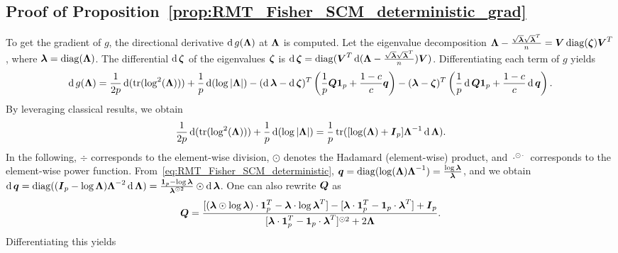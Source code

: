 \subsection{Proof of Proposition~\ref{prop:RMT_Fisher_SCM_deterministic_grad}}

To get the gradient of $g$, the directional derivative $\operatorname{d} g(\boldsymbol{\Lambda})$ at $\boldsymbol{\Lambda}$ is computed.
%
Let the eigenvalue decomposition $\boldsymbol{\Lambda} - \frac{\sqrt{\boldsymbol{\lambda}}\sqrt{\boldsymbol{\lambda}}^T}{n}=\boldsymbol{V}\operatorname{diag}(\boldsymbol{\zeta})\boldsymbol{V}^T$, where $\boldsymbol{\lambda}=\operatorname{diag}(\boldsymbol{\Lambda})$.
The differential $\operatorname{d}\boldsymbol{\zeta}$ of the eigenvalues $\boldsymbol{\zeta}$ is $\operatorname{d}\boldsymbol{\zeta}=\operatorname{diag}(\boldsymbol{V}^T\operatorname{d}(\boldsymbol{\Lambda} - \frac{\sqrt{\boldsymbol{\lambda}}\sqrt{\boldsymbol{\lambda}}^T}{n})\boldsymbol{V})$.
%
Differentiating each term of $g$ yields
\begin{equation*}
    \operatorname{d} g(\boldsymbol{\Lambda}) = \frac{1}{2p} \operatorname{d} (\operatorname{tr}(\log^2(\boldsymbol{\Lambda}))) + \frac{1}{p} \operatorname{d} (\log|\boldsymbol{\Lambda}|) - (\operatorname{d} \boldsymbol{\lambda}-\operatorname{d} \boldsymbol{\zeta})^T\left( \frac{1}{p} \boldsymbol{Q}\boldsymbol{1}_{p} +\frac{1-c}{c} \boldsymbol{q} \right) - (\boldsymbol{\lambda}-\boldsymbol{\zeta})^T\left( \frac{1}{p} \operatorname{d}\boldsymbol{Q}\boldsymbol{1}_{p}
    +\frac{1-c}{c} \operatorname{d}\boldsymbol{q} \right).
\end{equation*}
%
By leveraging classical results, we obtain
\begin{equation*}
    \frac{1}{2p} \operatorname{d} (\operatorname{tr}(\log^2(\boldsymbol{\Lambda}))) + \frac{1}{p} \operatorname{d} (\log|\boldsymbol{\Lambda}|)
    =
    \frac1p\operatorname{tr}([\log(\boldsymbol{\Lambda})+\boldsymbol{I}_{p}]\boldsymbol{\Lambda}^{-1}\operatorname{d}\boldsymbol{\Lambda}).
\end{equation*}
%
In the following, $\div$ corresponds to the element-wise division, $\odot$ denotes the Hadamard (element-wise) product, and $\cdot^{\odot\cdot}$ corresponds to the element-wise power function.
%
From~\eqref{eq:RMT_Fisher_SCM_deterministic}, $\boldsymbol{q}=\operatorname{diag}(\log(\boldsymbol{\Lambda})\boldsymbol{\Lambda}^{-1})=\frac{\log\boldsymbol{\lambda}}{\boldsymbol{\lambda}}$, and we obtain $\operatorname{d}\boldsymbol{q}=\operatorname{diag}((\boldsymbol{I}_{p}-\log\boldsymbol{\Lambda})\boldsymbol{\Lambda}^{-2}\operatorname{d}\boldsymbol{\Lambda})=\frac{\boldsymbol{1}_{p}-\log\boldsymbol{\lambda}}{\boldsymbol{\lambda}^{\odot 2}}\odot\operatorname{d}\boldsymbol{\lambda}$.
One can also rewrite $\boldsymbol{Q}$ as
\begin{equation*}
    \boldsymbol{Q} = \frac{[(\boldsymbol{\lambda}\odot\log\boldsymbol{\lambda})\cdot\boldsymbol{1}_{p}^T - \boldsymbol{\lambda}\cdot\log\boldsymbol{\lambda}^T] - [\boldsymbol{\lambda}\cdot\boldsymbol{1}_{p}^T - \boldsymbol{1}_{p}\cdot\boldsymbol{\lambda}^T] + \boldsymbol{I}_{p}}{[\boldsymbol{\lambda}\cdot\boldsymbol{1}_{p}^T - \boldsymbol{1}_{p}\cdot\boldsymbol{\lambda}^T]^{\odot 2} + 2\boldsymbol{\Lambda}}.
\end{equation*}
Differentiating this yields

